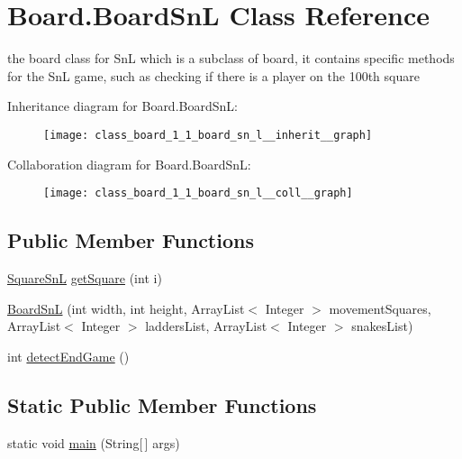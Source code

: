\hypertarget{class_board_1_1_board_sn_l}{}\section{Board.\+Board\+Sn\+L Class Reference}
\label{class_board_1_1_board_sn_l}


the board class for Sn\+L which is a subclass of board, it contains specific methods for the Sn\+L game, such as checking if there is a player on the 100th square  




Inheritance diagram for Board.\+Board\+Sn\+L\+:\nopagebreak
\begin{figure}[H]
\begin{center}
\leavevmode
\texttt{[image: class\_board\_1\_1\_board\_sn\_l\_\_inherit\_\_graph]}
\end{center}
\end{figure}


Collaboration diagram for Board.\+Board\+Sn\+L\+:\nopagebreak
\begin{figure}[H]
\begin{center}
\leavevmode
\texttt{[image: class\_board\_1\_1\_board\_sn\_l\_\_coll\_\_graph]}
\end{center}
\end{figure}
\subsection*{Public Member Functions}
\begin{DoxyCompactItemize}
\item 
\hyperlink{class_square_1_1_square_sn_l}{Square\+Sn\+L} \hyperlink{class_board_1_1_board_sn_l_a808a8299c5ee4a8256b5e68915fd9eca}{get\+Square} (int i)
\item 
\hyperlink{class_board_1_1_board_sn_l_a03f7b8911496b68ad4de0d1b0939220a}{Board\+Sn\+L} (int width, int height, Array\+List$<$ Integer $>$ movement\+Squares, Array\+List$<$ Integer $>$ ladders\+List, Array\+List$<$ Integer $>$ snakes\+List)
\item 
int \hyperlink{class_board_1_1_board_sn_l_aae2b39e92ddf94fefa4bc86a3bdb6055}{detect\+End\+Game} ()
\end{DoxyCompactItemize}
\subsection*{Static Public Member Functions}
\begin{DoxyCompactItemize}
\item 
static void \hyperlink{class_board_1_1_board_sn_l_a528d4e87b3553f7c0bdb7b5a0a3685d5}{main} (String\mbox{[}$\,$\mbox{]} args)
\end{DoxyCompactItemize}
